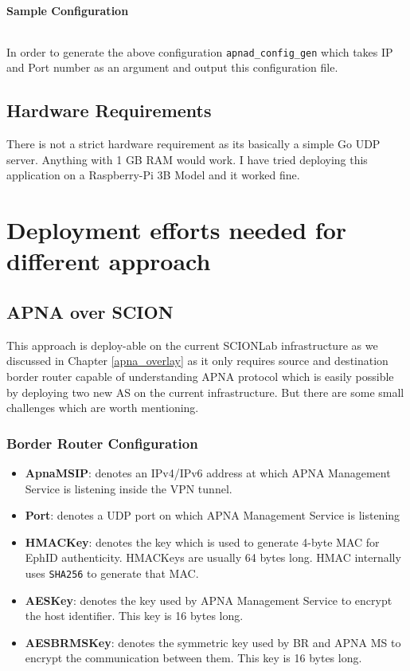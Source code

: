 \paragraph{Sample Configuration}
\begin{code}
\inputminted[frame=lines, framesep=2mm, baselinestretch=1.2, fontsize=\footnotesize, breaklines]{json}{code_snippets/apnad.json}
\end{code}

In order to generate the above configuration \texttt{apnad\_config\_gen} which takes IP and Port number as an argument and output this configuration file.

\subsection{Hardware Requirements}
There is not a strict hardware requirement as its basically a simple Go UDP server. Anything with 1 GB RAM would work. I have tried deploying this application on a Raspberry-Pi 3B Model and it worked fine.

\section{Deployment efforts needed for different approach} \label{lab:all}

\subsection{APNA over SCION}
This approach is deploy-able on the current SCIONLab infrastructure as we discussed in Chapter \ref{apna_overlay} as it only requires source and destination border router capable of understanding APNA protocol which is easily possible by deploying two new AS on the current infrastructure. But there are some small challenges which are worth mentioning.

\subsubsection{Border Router Configuration} \label{config:border_router}
\begin{itemize}
    \item \textbf{ApnaMSIP}: denotes an IPv4/IPv6 address at which APNA Management Service is listening inside the VPN tunnel.
    \item \textbf{Port}: denotes a UDP port on which APNA Management Service is listening
    \item \textbf{HMACKey}: denotes the key which is used to generate 4-byte MAC for EphID authenticity. HMACKeys are usually 64 bytes long. HMAC internally uses \texttt{SHA256} to generate that MAC.
    \item \textbf{AESKey}: denotes the key used by APNA Management Service to encrypt the host identifier. This key is 16 bytes long.
    \item \textbf{AESBRMSKey}: denotes the symmetric key used by BR and APNA MS to encrypt the communication between them. This key is 16 bytes long.
\end{itemize}

